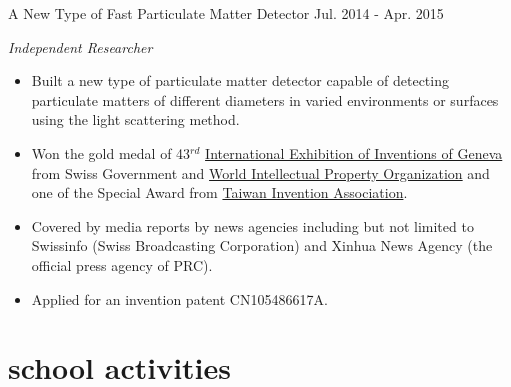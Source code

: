 \documentclass[hidelinks__VERSION__]{adamyi-cv}
\begin{document}
\begin{entrylist}

\entry
{A New Type of Fast Particulate Matter Detector}
{Jul. 2014 - Apr. 2015}
{\emph{Independent Researcher}
\begin{itemize}
\item Built a new type of particulate matter detector capable of detecting particulate matters of different diameters in varied environments or surfaces using the light scattering method.
\item Won the gold medal of 43$^{rd}$ \href{http://www.inventions-geneva.ch/en/}{International Exhibition of Inventions of Geneva} from Swiss Government and \href{http://www.wipo.int/}{World Intellectual Property Organization} and one of the Special Award from \href{http://www.tia-tw.net/}{Taiwan Invention Association}.
\item Covered by media reports by news agencies including but not limited to Swissinfo (Swiss Broadcasting Corporation) and Xinhua News Agency (the official press agency of PRC).
\item Applied for an invention patent CN105486617A.
\end{itemize}}


\end{entrylist}


\section{school activities}
\end{document}
